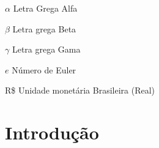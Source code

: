 \documentclass[
  12pt,		%
  a4paper,	%
  openright,%
  oneside,	%
  chapter=TITLE,		%
  section=TITLE,		%
  english,	%
  french,	%
  spanish,	%
  brazil
]{abntex2}
\begin{document}
    
    \begin{simbolos}
        \item[$\alpha$] Letra Grega Alfa
        \item[$\beta$] Letra grega Beta
        \item[$\gamma$] Letra grega Gama
        \item[$e$] Número de Euler
        \item[R\$] Unidade monetária Brasileira (Real)
    \end{simbolos}
    
    
    \tableofcontents*
    \newpage
    
    
    \textual
    \pagestyle{simple} 
    
    
    \chapter{Introdução}
    
\end{document}
